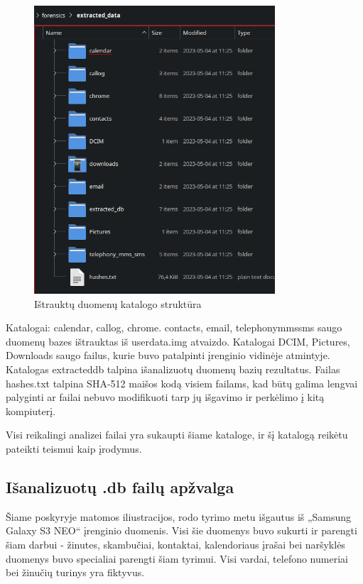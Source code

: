 \documentclass[a4paper,12pt,fleqn]{article}
\begin{document}
\begin{figure} [h]
    \centering
    \includegraphics[width=0.80\textwidth]{extraction_dir.png}
    \caption{Ištrauktų duomenų katalogo struktūra}
    \label{fig:extractdir}
\end{figure}
Katalogai: calendar, callog, chrome. contacts, email, telephony\textunderscore mms\textunderscore sms saugo duomenų bazes ištrauktas iš userdata.img atvaizdo. Katalogai DCIM, Pictures, Downloads saugo failus, kurie buvo patalpinti įrenginio vidinėje atmintyje. Katalogas extracted\textunderscore db talpina išanalizuotų duomenų bazių rezultatus. Failas hashes.txt talpina SHA-512 maišos kodą visiem failams, kad būtų galima lengvai palyginti ar failai nebuvo modifikuoti tarp jų išgavimo ir perkėlimo į kitą kompiuterį.

Visi reikalingi analizei failai yra sukaupti šiame kataloge, ir šį katalogą reikėtu pateikti teismui kaip įrodymus.
\clearpage

\subsection{Išanalizuotų .db failų apžvalga}
Šiame poskyryje matomos iliustracijos, rodo tyrimo metu išgautus iš „Samsung Galaxy S3 NEO“ įrenginio duomenis.  Visi šie duomenys buvo sukurti ir parengti šiam darbui  - žinutes, skambučiai, kontaktai, kalendoriaus įrašai bei naršyklės duomenys  buvo specialiai parengti šiam tyrimui. Visi vardai, telefono numeriai bei žinučių turinys yra fiktyvus.\\
\end{document}
